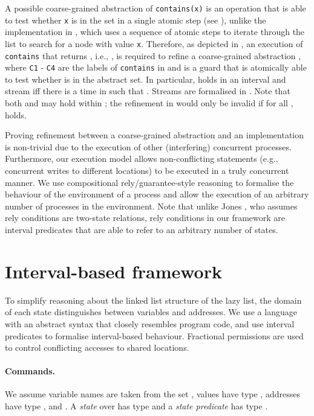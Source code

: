 \documentclass{article}
\theoremstyle{plain}
\theoremstyle{definition}
\begin{document}
A possible coarse-grained abstraction of {\tt contains(x)} is an
operation that is able to test whether {\tt x} is in the set in a
single atomic step (see ), unlike the implementation
in , which uses a sequence of atomic steps to
iterate through the list to search for a node with value {\tt x}.
Therefore, as depicted in , an execution of {\tt
  contains} that returns , i.e., , is
required to refine a coarse-grained abstraction , where {\tt C1} - {\tt C4} are the labels of
{\tt contains} in  and  is a
guard that is atomically able to test whether  is in the abstract
set.  In particular,  holds in an interval
 and stream  iff there is a time  in  such that
. Streams are formalised in
. Note that both 
and  may hold within ; the
refinement in  would only be invalid if for all ,  holds. 


Proving refinement between a coarse-grained abstraction and an
implementation is non-trivial due to the execution of other
(interfering) concurrent processes. Furthermore, our execution model
allows non-conflicting statements (e.g., concurrent writes to
different locations) to be executed in a truly concurrent manner. We
use compositional rely/guarantee-style reasoning \cite{Jon83} to
formalise the behaviour of the environment of a process and allow the
execution of an arbitrary number of processes in the environment. Note
that unlike Jones \cite{Jon83}, who assumes rely conditions are
two-state relations, rely conditions in our framework are interval
predicates that are able to refer to an arbitrary number of states.
 





\section{Interval-based framework}
\label{sec:an-interval-based}

To simplify reasoning about the linked list structure of the lazy
list, the domain of each state distinguishes between variables and
addresses. We use a language with an abstract syntax that closely
resembles program code, and use interval predicates to formalise
interval-based behaviour. Fractional permissions are used to control
conflicting accesses to shared locations.


\paragraph{Commands.}
We assume variable names are taken from the set , values have
type , addresses have type ,  and . A \emph{state} over  has type 
and a \emph{state predicate} has type .
\end{document}
